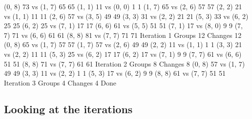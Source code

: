 \documentclass[letterpaper,10pt,english]{sphinxmanual}
\begin{document}
\begin{sphinxVerbatim}[commandchars=\\\{\}]
(0, 8) 73 vs (1, 7) 65 \PYGZhy{}\PYGZgt{} 65
(1, 1) 11 vs (0, 0) 1 \PYGZhy{}\PYGZgt{} 1
(1, 7) 65 vs (2, 6) 57 \PYGZhy{}\PYGZgt{} 57
(2, 2) 21 vs (1, 1) 11 \PYGZhy{}\PYGZgt{} 11
(2, 6) 57 vs (3, 5) 49 \PYGZhy{}\PYGZgt{} 49
(3, 3) 31 vs (2, 2) 21 \PYGZhy{}\PYGZgt{} 21
(5, 3) 33 vs (6, 2) 25 \PYGZhy{}\PYGZgt{} 25
(6, 2) 25 vs (7, 1) 17 \PYGZhy{}\PYGZgt{} 17
(6, 6) 61 vs (5, 5) 51 \PYGZhy{}\PYGZgt{} 51
(7, 1) 17 vs (8, 0) 9 \PYGZhy{}\PYGZgt{} 9
(7, 7) 71 vs (6, 6) 61 \PYGZhy{}\PYGZgt{} 61
(8, 8) 81 vs (7, 7) 71 \PYGZhy{}\PYGZgt{} 71
Iteration 1 Groups 12 Changes 12
(0, 8) 65 vs (1, 7) 57 \PYGZhy{}\PYGZgt{} 57
(1, 7) 57 vs (2, 6) 49 \PYGZhy{}\PYGZgt{} 49
(2, 2) 11 vs (1, 1) 1 \PYGZhy{}\PYGZgt{} 1
(3, 3) 21 vs (2, 2) 11 \PYGZhy{}\PYGZgt{} 11
(5, 3) 25 vs (6, 2) 17 \PYGZhy{}\PYGZgt{} 17
(6, 2) 17 vs (7, 1) 9 \PYGZhy{}\PYGZgt{} 9
(7, 7) 61 vs (6, 6) 51 \PYGZhy{}\PYGZgt{} 51
(8, 8) 71 vs (7, 7) 61 \PYGZhy{}\PYGZgt{} 61
Iteration 2 Groups 8 Changes 8
(0, 8) 57 vs (1, 7) 49 \PYGZhy{}\PYGZgt{} 49
(3, 3) 11 vs (2, 2) 1 \PYGZhy{}\PYGZgt{} 1
(5, 3) 17 vs (6, 2) 9 \PYGZhy{}\PYGZgt{} 9
(8, 8) 61 vs (7, 7) 51 \PYGZhy{}\PYGZgt{} 51
Iteration 3 Groups 4 Changes 4
Done
\end{sphinxVerbatim}


\subsection{Looking at the iterations}
\label{\detokenize{06-ShapeAnalysis:looking-at-the-iterations}}
\begin{sphinxVerbatim}[commandchars=\\\{\}]
       
   
\end{sphinxVerbatim}
\end{document}
